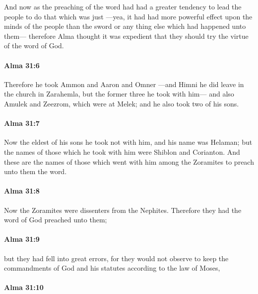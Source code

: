 			And now as the preaching of the word had had a greater tendency
			to lead the people to do that which was just
			---yea, it had had more powerful effect upon the minds of the people
			than the sword or any thing else which had happened unto them---
			therefore Alma thought it was expedient
			that they should try the virtue of the word of God.

		\paragraph{Alma 31:6} %
			\label{ALMA-31-6}

			Therefore he took Ammon and Aaron and Omner
			---and Himni he did leave in the church in Zarahemla,
			but the former three he took with him---
			and also Amulek and Zeezrom, which were at Melek;
			and he also took two of his sons.

		\paragraph{Alma 31:7} %
			\label{ALMA-31-7}

			Now the eldest of his sons he took not with him, and his name was Helaman;
			but the names of those which he took with him were Shiblon and Corianton.
			And these are the names of those which went with him among the Zoramites
			to preach unto them the word.

		\paragraph{Alma 31:8} %
			\label{ALMA-31-8}

			Now the Zoramites were dissenters from the Nephites.
			Therefore they had the word of God preached unto them;

		\paragraph{Alma 31:9} %
			\label{ALMA-31-9}

			but they had fell into great errors,
			for they would not observe to keep the commandments of God and his statutes
			according to the law of Moses,

		\paragraph{Alma 31:10} %
			\label{ALMA-31-10}

